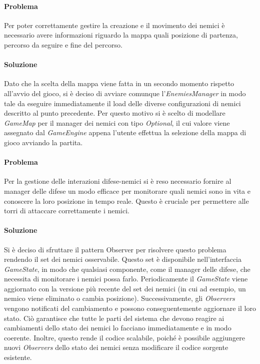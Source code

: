 \documentclass[a4paper,12pt]{report}
\begin{document}
\paragraph{Problema} Per poter correttamente gestire la creazione e il movimento dei nemici è necessario avere informazioni riguardo la mappa quali posizione di partenza, percorso da seguire e fine del percorso.

\paragraph{Soluzione} Dato che la scelta della mappa viene fatta in un secondo momento rispetto all'avvio del gioco, si è deciso di avviare comunque l'\textit{EnemiesManager} in modo tale da eseguire immediatamente il load delle diverse configurazioni di nemici descritto al punto precedente. Per questo motivo si è scelto di modellare \textit{GameMap} per il manager dei nemici con tipo \textit{Optional}, il cui valore viene assegnato dal \textit{GameEngine} appena l'utente effettua la selezione della mappa di gioco avviando la partita.

\paragraph{Problema} Per la gestione delle interazioni difese-nemici si è reso necessario fornire al manager delle difese un modo efficace per monitorare quali nemici sono in vita e conoscere la loro posizione in tempo reale. Questo è cruciale per permettere alle torri di attaccare correttamente i nemici.

\paragraph{Soluzione} Si è deciso di sfruttare il pattern Observer per risolvere questo problema rendendo il set dei nemici osservabile. Questo set è disponibile nell'interfaccia \textit{GameState}, in modo che qualsiasi componente, come il manager delle difese, che necessita di monitorare i nemici possa farlo. Periodicamente il \textit{GameState} viene aggiornato con la versione più recente del set dei nemici (in cui ad esempio, un nemico viene eliminato o cambia posizione). Successivamente, gli \textit{Observers} vengono notificati del cambiamento e possono conseguentemente aggiornare il loro stato. Ciò garantisce che tutte le parti del sistema che devono reagire ai cambiamenti dello stato dei nemici lo facciano immediatamente e in modo coerente. Inoltre, questo rende il codice scalabile, poiché è possibile aggiungere nuovi \textit{Observers} dello stato dei nemici senza modificare il codice sorgente esistente.
\end{document}
